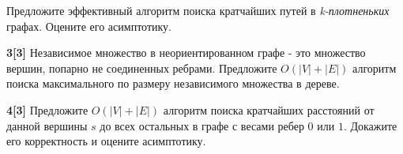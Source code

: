 \documentclass{article}
\begin{document}
Предложите эффективный алгоритм поиска кратчайших путей в \textit{k-плотненьких} графах. Оцените его асимптотику.

\medskip

\textbf{3[3]} Независимое множество в неориентированном графе - это множество вершин, попарно не соединенных ребрами. Предложите $O(|V| + |E|)$ алгоритм поиска максимального по размеру независимого множества в дереве.

\medskip

\textbf{4[3]} Предложите $O(|V | + |E|)$ алгоритм поиска кратчайших расстояний от данной вершины $s$ до всех остальных в графе с весами ребер $0$ или $1$. Докажите его корректность и оцените асимптотику.








\end{document}
